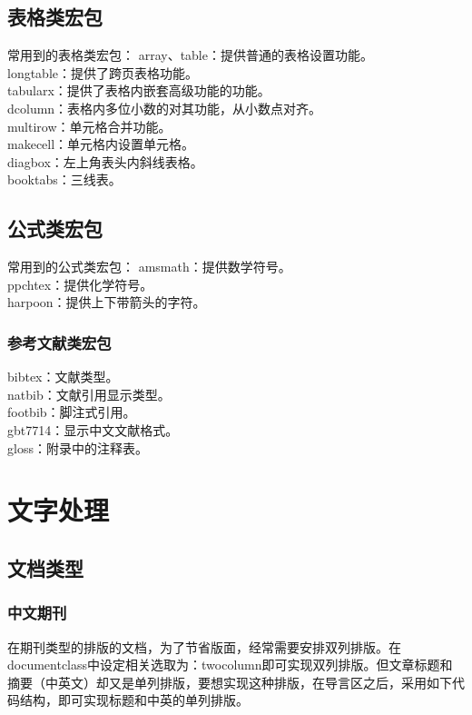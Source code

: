 \documentclass[12pt]{book}
\begin{document}
\section{表格类宏包}


常用到的表格类宏包：
array、table：提供普通的表格设置功能。\\
longtable：提供了跨页表格功能。\\
tabularx：提供了表格内嵌套高级功能的功能。\\
dcolumn：表格内多位小数的对其功能，从小数点对齐。\\
multirow：单元格合并功能。\\
makecell：单元格内设置单元格。\\
diagbox：左上角表头内斜线表格。\\
booktabs：三线表。


\section{公式类宏包}

常用到的公式类宏包：
amsmath：提供数学符号。\\
ppchtex：提供化学符号。\\
harpoon：提供上下带箭头的字符。

\subsection{参考文献类宏包}

bibtex：文献类型。\\
natbib：文献引用显示类型。\\
footbib：脚注式引用。\\
gbt7714：显示中文文献格式。\\
gloss：附录中的注释表。




\chapter{文字处理}

\section{文档类型}

\subsection{中文期刊}

在期刊类型的排版的文档，为了节省版面，经常需要安排双列排版。在documentclass中设定相关选取为：twocolumn即可实现双列排版。但文章标题和摘要（中英文）却又是单列排版，要想实现这种排版，在导言区之后，采用如下代码结构，即可实现标题和中英的单列排版。
\end{document}
